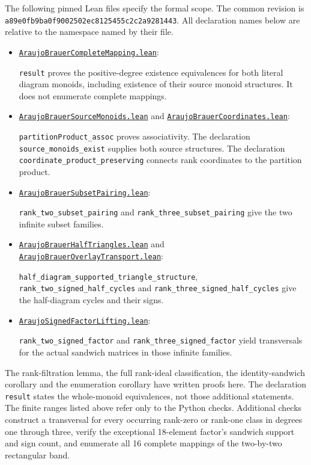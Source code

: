 \documentclass[11pt,a4paper]{article}
\newcommand{\LeanBase}{https://github.com/the-omega-institute/trureturing/blob/a89e0fb9ba0f9002502ec8125455c2c2a9281443/D5/S3/Combinatorics/PerfectMatchings/}
\newcommand{\leanfile}[2]{\href{\LeanBase#1.lean}{#2}}
\begin{document}
The following pinned Lean files specify the formal scope. The common revision is \texttt{a89e0fb9ba0f9002502ec8125455c2c2a9281443}. All declaration names below are relative to the namespace named by their file.
\begin{itemize}
\item \leanfile{AraujoBrauerCompleteMapping}{\texttt{AraujoBrauerCompleteMapping.lean}}:\par
\texttt{result} proves the positive-degree existence equivalences for both literal diagram monoids, including existence of their source monoid structures. It does not enumerate complete mappings.
\item \leanfile{AraujoBrauerSourceMonoids}{\texttt{AraujoBrauerSourceMonoids.lean}} and \leanfile{AraujoBrauerCoordinates}{\texttt{AraujoBrauerCoordinates.lean}}:\par
\texttt{partitionProduct\_assoc} proves associativity. The declaration \texttt{source\_monoids\_exist} supplies both source structures. The declaration \texttt{coordinate\_product\_preserving} connects rank coordinates to the partition product.
\item \leanfile{AraujoBrauerSubsetPairing}{\texttt{AraujoBrauerSubsetPairing.lean}}:\par
\texttt{rank\_two\_subset\_pairing} and \texttt{rank\_three\_subset\_pairing} give the two infinite subset families.
\item \leanfile{AraujoBrauerHalfTriangles}{\texttt{AraujoBrauerHalfTriangles.lean}} and \leanfile{AraujoBrauerOverlayTransport}{\texttt{AraujoBrauerOverlayTransport.lean}}:\par
\texttt{half\_diagram\_supported\_triangle\_structure}, \texttt{rank\_two\_signed\_half\_cycles} and \texttt{rank\_three\_signed\_half\_cycles} give the half-diagram cycles and their signs.
\item \leanfile{AraujoSignedFactorLifting}{\texttt{AraujoSignedFactorLifting.lean}}:\par
\texttt{rank\_two\_signed\_factor} and \texttt{rank\_three\_signed\_factor} yield transversals for the actual sandwich matrices in those infinite families.
\end{itemize}
The rank-filtration lemma, the full rank-ideal classification, the identity-sandwich corollary and the enumeration corollary have written proofs here. The declaration \texttt{result} states the whole-monoid equivalences, not those additional statements. The finite ranges listed above refer only to the Python checks. Additional checks construct a transversal for every occurring rank-zero or rank-one class in degrees one through three, verify the exceptional 18-element factor's sandwich support and sign count, and enumerate all 16 complete mappings of the two-by-two rectangular band.
\end{document}
